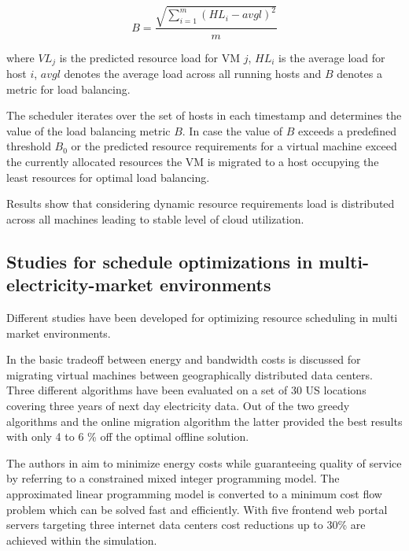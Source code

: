 \[ B = \frac{\sqrt{\sum_{i=1}^{m}{(HL_i - avgl)^2}}}{m} \]

where $VL_j$ is the predicted resource load for VM $j$, $HL_i$ is the average load for host $i$, $avgl$ denotes the average
load across all running hosts and $B$ denotes a metric for load balancing. 

The scheduler iterates over the set of hosts in each timestamp and determines the value of the load balancing metric $B$. In case the value of 
$B$ exceeds a predefined threshold $B_0$ or the predicted resource requirements for a virtual machine exceed the currently allocated resources 
the VM is migrated to a host occupying the least resources for optimal load balancing. 

Results show that considering dynamic resource requirements load is distributed across all machines leading to stable level of cloud utilization. 







\subsection{Studies for schedule optimizations in multi-electricity-market environments}

Different studies have been developed for optimizing resource scheduling in multi market environments. 

In \cite{buchbinder2011online} the basic tradeoff between energy and bandwidth costs is discussed for migrating virtual machines between geographically distributed data centers. 
Three different algorithms have been evaluated on a set of 30 US locations covering three years of next day electricity data. Out of the two greedy algorithms and the online migration algorithm the latter provided the best results with only 4 to 6 \% off the optimal offline solution. 

The authors in \cite{rao2010minimizing} aim to minimize energy costs while guaranteeing quality of service by referring to a constrained mixed integer programming model. The approximated linear programming model is converted to a minimum cost flow problem which can be solved fast and efficiently. With five frontend web portal servers targeting three internet data centers cost reductions up to 30\% are achieved within the simulation. 

